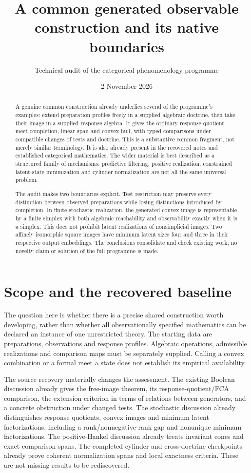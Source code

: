 \documentclass[11pt]{article}
\title{A common generated observable construction and its native boundaries}
\author{Technical audit of the categorical phenomenology programme}
\date{2 November 2026}
\begin{document}
\maketitle
\begin{abstract}
A genuine common construction already underlies several of the programme's examples: extend preparation profiles freely in a supplied algebraic doctrine, then take their image in a supplied response algebra. It gives the ordinary response quotient, meet completion, linear span and convex hull, with typed comparisons under compatible changes of tests and doctrine. This is a substantive common fragment, not merely similar terminology. It is also already present in the recovered notes and established categorical mathematics. The wider material is best described as a structured family of mechanisms: predictive filtering, positive realization, constrained latent-state minimization and cylinder normalization are not all the same universal problem.

The audit makes two boundaries explicit. Test restriction may preserve every distinction between observed preparations while losing distinctions introduced by completion. In finite stochastic realization, the generated convex image is representable by a finite simplex with both algebraic reachability and observability exactly when it is a simplex. This does not prohibit latent realizations of nonsimplicial images. Two affinely isomorphic square images have minimum latent sizes four and three in their respective output embeddings. The conclusions consolidate and check existing work; no novelty claim or solution of the full programme is made.
\end{abstract}

\section{Scope and the recovered baseline}

The question here is whether there is a precise shared construction worth developing, rather than whether all observationally specified mathematics can be declared an instance of one unrestricted theory. The starting data are preparations, observations and response profiles. Algebraic operations, admissible realizations and comparison maps must be separately supplied. Calling a convex combination or a formal meet a state does not establish its empirical availability.

The source recovery materially changes the assessment. The existing Boolean discussion already gives the free-image theorem, its response-quotient/FCA comparison, the extension criterion in terms of relations between generators, and a concrete obstruction under changed tests. The stochastic discussion already distinguishes response quotients, convex images and minimum latent factorizations, including a rank/nonnegative-rank gap and nonunique minimum factorizations. The positive-Hankel discussion already treats invariant cones and exact comparison spans. The completed cylinder and cross-doctrine checkpoints already prove coherent normalization spans and local exactness criteria. These are not missing results to be rediscovered.
\end{document}
